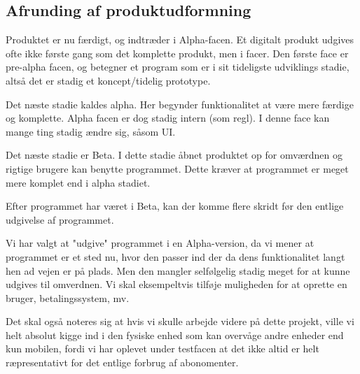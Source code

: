 \subsection{Afrunding af produktudformning}
Produktet er nu færdigt, og indtræder i Alpha-facen. Et digitalt produkt udgives ofte ikke første gang som det komplette produkt, men i facer. Den første face er pre-alpha facen, og betegner et program som er i sit tideligste udviklings stadie, altså det er stadig et koncept/tidelig prototype.

Det næste stadie kaldes alpha. Her begynder funktionalitet at være mere færdige og komplette. Alpha facen er dog stadig intern (som regl). I denne face kan mange ting stadig ændre sig, såsom UI.

Det næste stadie er Beta. I dette stadie åbnet produktet op for omværdnen og rigtige brugere kan benytte programmet. Dette kræver at programmet er meget mere komplet end i alpha stadiet.

Efter programmet har været i Beta, kan der komme flere skridt før den entlige udgivelse af programmet.

Vi har valgt at "udgive" programmet i en Alpha-version, da vi mener at programmet er et sted nu, hvor den passer ind der da dens funktionalitet langt hen ad vejen er på plads. Men den mangler selfølgelig stadig meget for at kunne udgives til omverdnen. Vi skal eksempeltvis tilføje muligheden for at oprette en bruger, betalingssystem, mv.

Det skal også noteres sig at hvis vi skulle arbejde videre på dette projekt, ville vi helt absolut kigge ind i den fysiske enhed som kan overvåge andre enheder end kun mobilen, fordi vi har oplevet under testfacen at det ikke altid er helt ræpresentativt for det entlige forbrug af abonomenter.